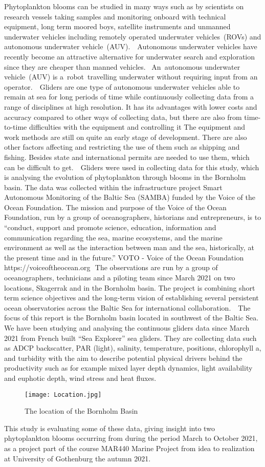 \documentclass[../Main.tex]{subfiles}
\begin{document}
Phytoplankton blooms can be studied in many ways such as by scientists on research vessels taking samples and monitoring onboard with technical equipment, long term moored boys, satellite instruments and unmanned underwater vehicles including remotely operated underwater vehicles (ROVs) and autonomous underwater vehicle (AUV).    Autonomous underwater vehicles have recently become an attractive alternative for underwater search and exploration since they are cheaper than manned vehicles.  An autonomous underwater vehicle (AUV) is a robot travelling underwater without requiring input from an operator.   Gliders are one type of autonomous underwater vehicles able to remain at sea for long periods of time while continuously collecting data from a range of disciplines at high resolution. It has its advantages with lower costs and accuracy compared to other ways of collecting data, but there are also from time-to-time difficulties with the equipment and controlling it The equipment and work methods are still on quite an early stage of development. There are also other factors affecting and restricting the use of them such as shipping and fishing. Besides state and international permits are needed to use them, which can be difficult to get.   Gliders were used in collecting data for this study, which is analysing the evolution of phytoplankton through blooms in the Bornholm basin. The data was collected within the infrastructure project Smart Autonomous Monitoring of the Baltic Sea (SAMBA) funded by the Voice of the Ocean Foundation. 
The mission and purpose of the Voice of the Ocean Foundation, run by a group of oceanographers, historians and entrepreneurs, is to “conduct, support and promote science, education, information and communication regarding the sea, marine ecosystems, and the marine environment as well as the interaction between man and the sea, historically, at the present time and in the future.”\supercite{VOTO2021} VOTO - Voice of the Ocean Foundation https://voiceoftheocean.org  The observations are run by a group of oceanographers, technicians and a piloting team since March 2021 on two locations, Skagerrak and in the Bornholm basin. The project is combining short term science objectives and the long-term vision of establishing several persistent ocean observatories across the Baltic Sea for international collaboration.   The focus of this report is the Bornholm basin located in southwest of the Baltic Sea. We have been studying and analysing the continuous gliders data since March 2021 from French built “Sea Explorer” sea gliders. They are collecting data such as ADCP backscatter, PAR (light), salinity, temperature, positions, chlorophyll a, and turbidity with the aim to describe potential physical drivers behind the productivity such as for example mixed layer depth dynamics, light availability and euphotic depth, wind stress and heat fluxes. 
\begin{figure}[H]
\texttt{[image: Location.jpg]}
\caption{The location of the Bornholm Basin}
\label{fig:loc}
\end{figure}
This study is evaluating some of these data, giving insight into two phytoplankton blooms occurring from during the period March to October 2021, as a project part of the course MAR440 Marine Project from idea to realization at University of Gothenburg the autumn 2021. 
\end{document}
